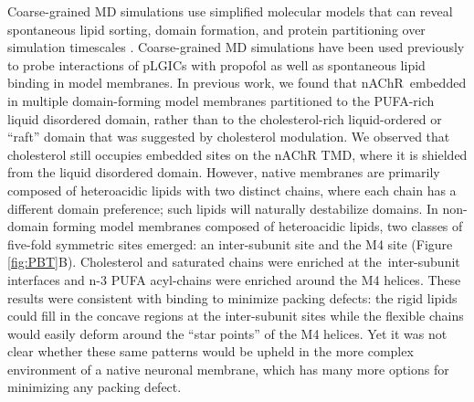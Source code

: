 \documentclass[%
 aip,
 amsmath,amssymb,
 preprint,%
]{revtex4-1}\usepackage{setspace}
\newcommand{\liam}[1]{\textcolor{black}{#1}}
\newcommand{\nachr}{nAChR}
\newcommand{\plgic}{pLGIC}
\begin{document}
Coarse-grained MD simulations use simplified molecular models that can reveal spontaneous lipid sorting, domain formation, and protein partitioning over simulation timescales \cite{Domanski2012,Chavent2016,Carpenter2018,Ingolfsson2020}. Coarse-grained MD simulations have been used previously to probe interactions of \plgic s with propofol\cite{Joseph2016} as well as spontaneous lipid binding in model membranes\cite{Sharp2019,Woods2019,Tong2019}.  
In previous work, we found that \nachr~embedded in multiple domain-forming model membranes partitioned to the PUFA-rich liquid disordered domain\cite{Sharp2019}, rather than to the cholesterol-rich liquid-ordered or ``raft'' domain that was suggested by cholesterol modulation.  We observed that cholesterol still occupies embedded sites on the \nachr{} TMD, where it is shielded from the liquid disordered domain. However, native membranes are primarily composed of heteroacidic lipids with two distinct chains, where each chain has a different domain preference; such lipids will naturally destabilize domains. In non-domain forming model membranes composed of heteroacidic lipids, two classes of five-fold symmetric sites emerged: an inter-subunit site and the M4 site (Figure \ref{fig:PBT}B).  Cholesterol and saturated chains were enriched at the~inter-subunit interfaces and n-3 PUFA acyl-chains were enriched around the M4 helices\cite{Woods2019}. These results were consistent with binding to minimize packing defects: the rigid lipids could fill in the concave regions at the inter-subunit sites while the flexible chains would easily deform around the ``star points'' of the M4 helices.  Yet it was not clear whether these same patterns would be upheld in the more complex environment of a native neuronal membrane, which has many more options for minimizing any packing defect.  
\end{document}
